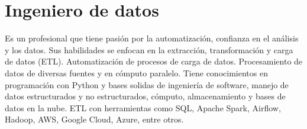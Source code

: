 \chapter{Ingeniero de datos}
Es un profesional que tiene pasi\'on por la automatizaci\'on, confianza en el an\'alisis y los datos. Sus habilidades se enfocan en la 
extracci\'on, transformaci\'on y carga de datos (ETL). Automatizaci\'on de procesos de carga de datos. Procesamiento de datos de diversas fuentes y en c\'omputo
paralelo. Tiene conocimientos en programaci\'on con Python y bases solidas de ingenier\'ia de software, manejo de datos estructurados y no estructurados, c\'omputo, almacenamiento y bases de datos en la nube. 
ETL con herramientas como SQL, Apache Spark, Airflow, Hadoop, AWS, Google Cloud, Azure, entre otros.

